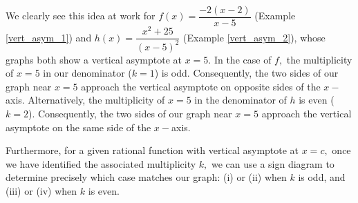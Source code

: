 \documentclass[12pt]{book}
\theoremstyle{definition}
\begin{document}
{\begin{minipage}{1.0\linewidth}
\begin{center}
\begin{multicols}{2}
\end{multicols}
\end{center}
\end{minipage}
}
We clearly see this idea at work for $f(x)=\dfrac{-2(x-2)}{x-5}$ (Example \ref{vert_asym_1}) and $h(x)=\dfrac{x^2+25}{(x-5)^2}$ (Example \ref{vert_asym_2}), whose graphs both show a vertical asymptote at $x=5$.  In the case of $f,$ the multiplicity of $x=5$ in our denominator ($k=1$) is odd.  Consequently, the two sides of our graph near $x=5$ approach the vertical asymptote on opposite sides of the $x-$axis.  Alternatively, the multiplicity of $x=5$ in the denominator of $h$ is even ($k=2$).  Consequently, the two sides of our graph near $x=5$ approach the vertical asymptote on the same side of the $x-$axis.
\par
Furthermore, for a given rational function with vertical asymptote at $x=c,$ once we have identified the associated multiplicity $k,$ we can use a sign diagram to determine precisely which case matches our graph: (i) or (ii) when $k$ is odd, and (iii) or (iv) when $k$ is even.
\end{document}
